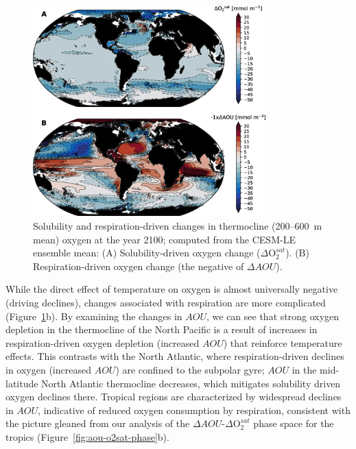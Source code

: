 \documentclass{report_chapter}
\begin{document}
\begin{figure}[tbp]
\centering
\includegraphics[width=0.8\textwidth]{cesm-thermocline-o2-change-sat-aou.png}
\caption{Solubility and respiration-driven changes in thermocline (200--600~m mean) oxygen at the year 2100; computed from the CESM-LE ensemble mean:
(A) Solubility-driven oxygen change ($\Delta\mathrm{O}_2^{sat}$).
(B) Respiration-driven oxygen change (the negative of $\Delta{}AOU$).}
\label{fig:cesm-thermocline-o2sat-aou-change}
\end{figure}

While the direct effect of temperature on oxygen is almost universally negative (driving declines), changes associated with respiration are more complicated (Figure~\ref{fig:cesm-thermocline-o2sat-aou-change}b).
By examining the changes in $AOU$, we can see that strong oxygen depletion in the thermocline of the North Pacific is a result of increases in respiration-driven oxygen depletion (increased $AOU$) that reinforce temperature effects.
This contrasts with the North Atlantic, where respiration-driven declines in oxygen (increased $AOU$) are confined to the subpolar gyre; $AOU$ in the mid-latitude North Atlantic thermocline decreases, which mitigates solubility driven oxygen declines there.
Tropical regions are characterized by widespread declines in $AOU$, indicative of reduced oxygen consumption by respiration, consistent with the picture gleaned from our analysis of the $\Delta AOU$-$\Delta\mathrm{O}_2^{sat}$ phase space for the tropics (Figure~\ref{fig:aou-o2sat-phase}b).
\end{document}
